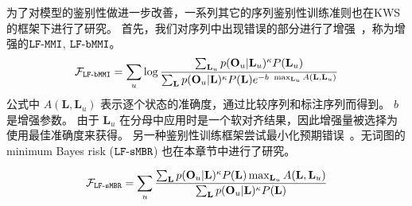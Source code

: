 为了对模型的鉴别性做进一步改善，一系列其它的序列鉴别性训练准则也在KWS的框架下进行了研究。 
首先，我们对序列中出现错误的部分进行了增强~\cite{povey2008boosted}，称为增强的$\tt{ LF\text{-}MMI}$, $\tt{ LF\text{-}bMMI}$。
\begin{equation}
\label{equ:kws-bmmi}
\begin{split}
\mathcal{F}_{\tt{LF\text{-}bMMI}}
=\sum_{u} \log \frac {\sum_{\mathbf{L}_u} p(\mathbf{O}_u|\mathbf{L}_u)^{\kappa}P(\mathbf{L}_u)}{\sum_{\mathbf{L}} p(\mathbf{O}_u|\mathbf{L})^{\kappa}P(\mathbf{L})e^{-b\ \mathop{\max}_{\mathbf{L}_u} A(\mathbf{L},\mathbf{L}_u)}}  
\end{split}
\end{equation}
公式中 $A(\mathbf{L},\mathbf{L}_u)$ 表示逐个状态的准确度，通过比较序列和标注序列而得到。
$b$ 是增强参数。
由于 $\mathbf{L}_u$ 在分母中应用时是一个软对齐结果，因此增强量被选择为使用最佳准确度来获得。
另一种鉴别性训练框架尝试最小化预期错误~\cite{gibson2006hypothesis}。无词图的minimum
Bayes risk ($\tt{LF\text{-}sMBR}$) 也在本章节中进行了研究。

\begin{equation}
\label{equ:kws-smbr}
\begin{split}
\mathcal{F}_{\tt{LF\text{-}sMBR}}
=\sum_{u}  \frac {\sum_{\mathbf{L}} p(\mathbf{O}_u|\mathbf{L})^{\kappa}P(\mathbf{L})\mathop{\max}_{\mathbf{L}_u} A(\mathbf{L},\mathbf{L}_u)}{\sum_{\mathbf{L}} p(\mathbf{O}_u|\mathbf{L})^{\kappa}P(\mathbf{L})}  
\end{split}
\end{equation}


